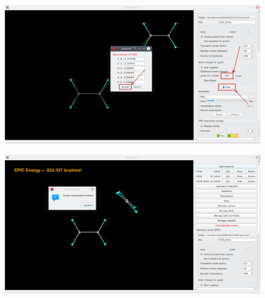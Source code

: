 \documentclass[a4paper,10pt]{article}
\begin{document}
\begin{minipage}{.5\linewidth}
\begin{figure}[H]
\caption{\label{fig:53}}
\begin{center}
\includegraphics[width=0.95\linewidth]{damqt_QS_fig53_b.png}
\end{center}
\end{figure} 
\end{minipage}
\begin{minipage}{.5\linewidth}
\begin{figure}[H]
\caption{\label{fig:54}}
\begin{center}
\includegraphics[width=0.95\linewidth]{damqt_QS_fig54.png}
\end{center}
\end{figure} 
\end{minipage}
\end{document}
